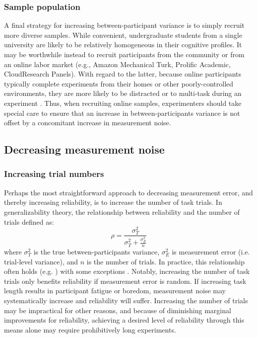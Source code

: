 \documentclass[a4paper,notitlepage,12pt]{article}
\begin{document}
\subsubsection{Sample population}

A final strategy for increasing between-participant variance is to simply recruit more diverse samples. While convenient, undergraduate students from a single university are likely to be relatively homogeneous in their cognitive profiles. It may be worthwhile instead to recruit participants from the community or from an online labor market (e.g., Amazon Mechanical Turk, Prolific Academic, CloudResearch Panels). With regard to the latter, because online participants typically complete experiments from their homes or other poorly-controlled environments, they are more likely to be distracted or to multi-task during an experiment \cite{newman2021data}. Thus, when recruiting online samples, experimenters should take special care to ensure that an increase in between-participants variance is not offset by a concomitant increase in measurement noise.

\subsection{Decreasing measurement noise}

\subsubsection{Increasing trial numbers}

Perhaps the most straightforward approach to decreasing measurement error, and thereby increasing reliability, is to increase the number of task trials. In generalizability theory, the relationship between reliability and the number of trials defined as:
\begin{equation}
    \rho = \frac{\sigma^2_T}{\sigma^2_T + \frac{\sigma^2_E}{n}}
\end{equation}
where $\sigma^2_T$ is the true between-participants variance, $\sigma^2_E$ is measurement error (i.e. trial-level variance), and $n$ is the number of trials. In practice, this relationship often holds (e.g. \cite{paap2016role, cooper2017role}) with some exceptions \cite{price2015empirical, klingelhoefer2022robust}. Notably, increasing the number of task trials only benefits reliability if measurement error is random. If increasing task length results in participant fatigue or boredom, measurement noise may systematically increase and reliability will suffer. Increasing the number of trials may be impractical for other reasons, and because of diminishing marginal improvements for reliability, achieving a desired level of reliability through this means alone may require prohibitively long experiments.
\end{document}
